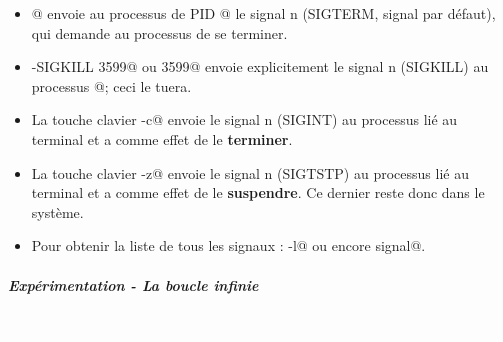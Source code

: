 \documentclass[11pt,a4paper]{article}
\begin{document}
					\begin{itemize}
				
			\item {}@
						envoie au processus de PID 
						@
						le signal n (SIGTERM, signal par d\'efaut),
						qui demande au processus de se terminer.
					
			\item \verb@kill -SIGKILL 3599@ 
						ou  3599@
						envoie explicitement le signal n (SIGKILL) au processus 
						@; ceci le tuera.
					
			\item 
						La touche clavier \verb@Ctrl-c@
						envoie le signal n (SIGINT) au processus li\'e au terminal
						et a comme effet de le
						\textbf{terminer}.
					
			\item 
						La touche clavier \verb@Ctrl-z@
						envoie le signal n (SIGTSTP) au processus li\'e au terminal
						et a comme effet de le 
						\textbf{suspendre}.
						Ce dernier reste donc dans le syst\`eme.
					
			\item 
						Pour obtenir la liste de tous les signaux :
						\verb@kill -l@ ou 
						encore  signal@.
					
					\end{itemize}
				
            \par
        
			
		\subparagraph{Exp\'erimentation - La boucle infinie} 
		
					\textcolor{white}{.} \par
				
            \par
        
\end{document}
